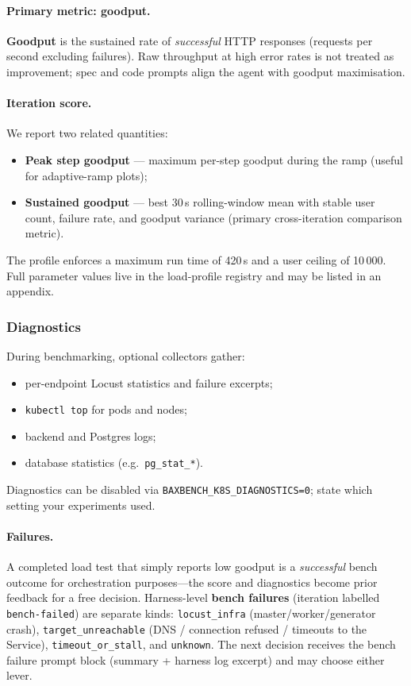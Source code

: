 \paragraph{Primary metric: goodput.}
\textbf{Goodput} is the sustained rate of \emph{successful} HTTP responses
(requests per second excluding failures).  Raw throughput at high error rates
is not treated as improvement; spec and code prompts align the agent with
goodput maximisation.

\paragraph{Iteration score.}
We report two related quantities:
\begin{itemize}
  \item \textbf{Peak step goodput} --- maximum per-step goodput during the
        ramp (useful for adaptive-ramp plots);
  \item \textbf{Sustained goodput} --- best 30\,s rolling-window mean with
        stable user count, failure rate, and goodput variance (primary
        cross-iteration comparison metric).
\end{itemize}
The profile enforces a maximum run time of 420\,s and a user ceiling of
10\,000.  Full parameter values live in the load-profile registry and may be
listed in an appendix.

\subsubsection{Diagnostics}

During benchmarking, optional collectors gather:
\begin{itemize}
  \item per-endpoint Locust statistics and failure excerpts;
  \item \texttt{kubectl top} for pods and nodes;
  \item backend and Postgres logs;
  \item database statistics (e.g.\ \texttt{pg\_stat\_*}).
\end{itemize}
Diagnostics can be disabled via \texttt{BAXBENCH\_K8S\_DIAGNOSTICS=0}; state
which setting your experiments used.

\paragraph{Failures.}
A completed load test that simply reports low goodput is a \emph{successful}
bench outcome for orchestration purposes---the score and diagnostics become
prior feedback for a free decision.  Harness-level \textbf{bench failures}
(iteration labelled \texttt{bench-failed}) are separate kinds:
\texttt{locust\_infra} (master/worker/generator crash),
\texttt{target\_unreachable} (DNS / connection refused / timeouts to the
Service), \texttt{timeout\_or\_stall}, and \texttt{unknown}.  The next
decision receives the bench failure prompt block (summary + harness log
excerpt) and may choose either lever.


